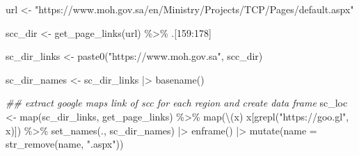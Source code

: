 \documentclass[
  letterpaper,
  DIV=11,
  numbers=noendperiod]{scrreprt}
\newenvironment{Shaded}{\begin{snugshade}}{\end{snugshade}}
\newcommand{\AttributeTok}[1]{\textcolor[rgb]{0.40,0.45,0.13}{#1}}
\newcommand{\DecValTok}[1]{\textcolor[rgb]{0.68,0.00,0.00}{#1}}
\newcommand{\DocumentationTok}[1]{\textcolor[rgb]{0.37,0.37,0.37}{\textit{#1}}}
\newcommand{\FunctionTok}[1]{\textcolor[rgb]{0.28,0.35,0.67}{#1}}
\newcommand{\NormalTok}[1]{\textcolor[rgb]{0.00,0.23,0.31}{#1}}
\newcommand{\OtherTok}[1]{\textcolor[rgb]{0.00,0.23,0.31}{#1}}
\newcommand{\SpecialCharTok}[1]{\textcolor[rgb]{0.37,0.37,0.37}{#1}}
\newcommand{\StringTok}[1]{\textcolor[rgb]{0.13,0.47,0.30}{#1}}
\begin{document}
\begin{Shaded}
\begin{Highlighting}[]
\NormalTok{url }\OtherTok{\textless{}{-}} \StringTok{"https://www.moh.gov.sa/en/Ministry/Projects/TCP/Pages/default.aspx"}

\NormalTok{scc\_dir }\OtherTok{\textless{}{-}} \FunctionTok{get\_page\_links}\NormalTok{(url) }\SpecialCharTok{\%\textgreater{}\%}
\NormalTok{  .[}\DecValTok{159}\SpecialCharTok{:}\DecValTok{178}\NormalTok{] }

\NormalTok{sc\_dir\_links }\OtherTok{\textless{}{-}} \FunctionTok{paste0}\NormalTok{(}\StringTok{"https://www.moh.gov.sa"}\NormalTok{, scc\_dir)}

\NormalTok{sc\_dir\_names }\OtherTok{\textless{}{-}}\NormalTok{ sc\_dir\_links }\SpecialCharTok{|\textgreater{}}
  \FunctionTok{basename}\NormalTok{()}

\DocumentationTok{\#\# extract google maps link of scc for each region and create data frame}
\NormalTok{sc\_loc }\OtherTok{\textless{}{-}} \FunctionTok{map}\NormalTok{(sc\_dir\_links, get\_page\_links) }\SpecialCharTok{\%\textgreater{}\%}
  \FunctionTok{map}\NormalTok{(\textbackslash{}(x) x[}\FunctionTok{grepl}\NormalTok{(}\StringTok{"https://goo.gl"}\NormalTok{, x)]) }\SpecialCharTok{\%\textgreater{}\%}
    \FunctionTok{set\_names}\NormalTok{(., sc\_dir\_names) }\SpecialCharTok{|\textgreater{}}
  \FunctionTok{enframe}\NormalTok{() }\SpecialCharTok{|\textgreater{}}
    \FunctionTok{mutate}\NormalTok{(}\AttributeTok{name =} \FunctionTok{str\_remove}\NormalTok{(name, }\StringTok{".aspx"}\NormalTok{))}
\end{Highlighting}
\end{Shaded}
\end{document}
